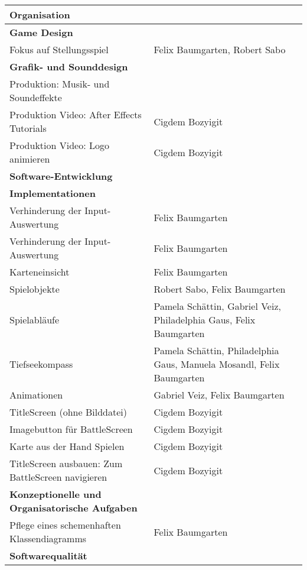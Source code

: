 \begin{tabular}{|p{8cm}|p{10cm}|}
\hline
\textbf{Organisation} &  \\ \hline
\textbf{Game Design} &  \\ \hline
Fokus auf Stellungsspiel & Felix Baumgarten, Robert Sabo \\ \hline
\textbf{Grafik- und Sounddesign} & \\ \hline
Produktion: Musik- und Soundeffekte & \\ \hline
Produktion Video: After Effects Tutorials & Cigdem Bozyigit \\ \hline
Produktion Video: Logo animieren & Cigdem Bozyigit \\ \hline
\textbf{Software-Entwicklung} & \\ \hline
\textbf{Implementationen} & \\ \hline
Verhinderung der Input-Auswertung & Felix Baumgarten \\ \hline
Verhinderung der Input-Auswertung & Felix Baumgarten \\ \hline
Karteneinsicht & Felix Baumgarten \\ \hline
Spielobjekte & Robert Sabo, Felix Baumgarten \\ \hline
Spielabläufe & Pamela Schättin, Gabriel Veiz, Philadelphia Gaus, Felix Baumgarten \\ \hline
Tiefseekompass & Pamela Schättin, Philadelphia Gaus, Manuela Mosandl, Felix Baumgarten \\ \hline
Animationen & Gabriel Veiz, Felix Baumgarten \\ \hline
TitleScreen (ohne Bilddatei) & Cigdem Bozyigit \\ \hline
Imagebutton für BattleScreen & Cigdem Bozyigit \\ \hline
Karte aus der Hand Spielen & Cigdem Bozyigit \\ \hline
TitleScreen ausbauen: Zum BattleScreen navigieren & Cigdem Bozyigit \\ \hline
\textbf{Konzeptionelle und Organisatorische Aufgaben} & \\ \hline
Pflege eines schemenhaften Klassendiagramms  & Felix Baumgarten \\ \hline
\textbf{Softwarequalität} & \\
\hline
\end{tabular}